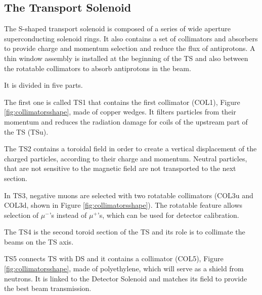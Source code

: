 \subsection{The Transport Solenoid}
The S-shaped transport solenoid is composed of a series of wide aperture superconducting
solenoid rings. It also contains a set of collimators and absorbers to provide charge and 
momentum selection and reduce the flux of antiprotons.
A thin window assembly is installed at the 
beginning of the TS and also between the rotatable collimators to absorb antiprotons in 
the beam. 

It is divided in five parts. 

The first one is called TS1 that contains the first collimator (COL1), 
Figure \ref{fig:collimatorsshape}, made of copper wedges. 
It filters particles from their momentum and reduces the radiation damage for coils of the 
upstream part of the TS (TSu). 

The TS2 contains a toroidal field in order to create a 
vertical displacement of the charged particles,
according to their charge and momentum.
Neutral particles, that are not sensitive to the magnetic 
field are not transported to the next section.

In TS3, negative muons are selected with two rotatable collimators (COL3u and COL3d, 
shown in Figure \ref{fig:collimatorsshape}). 
The rotatable feature allows selection of $\mu^-$'s instead of $\mu^+$'s, which can 
be used for detector calibration. 

The TS4 is the second toroid section of the TS and its role is 
to collimate the beams on the TS axis.

TS5 connects TS with DS and it contains a collimator (COL5), 
Figure \ref{fig:collimatorsshape}, made of polyethylene, 
which will serve as a shield from neutrons. It is linked to the Detector 
Solenoid and matches its field to provide the best beam transmission.


